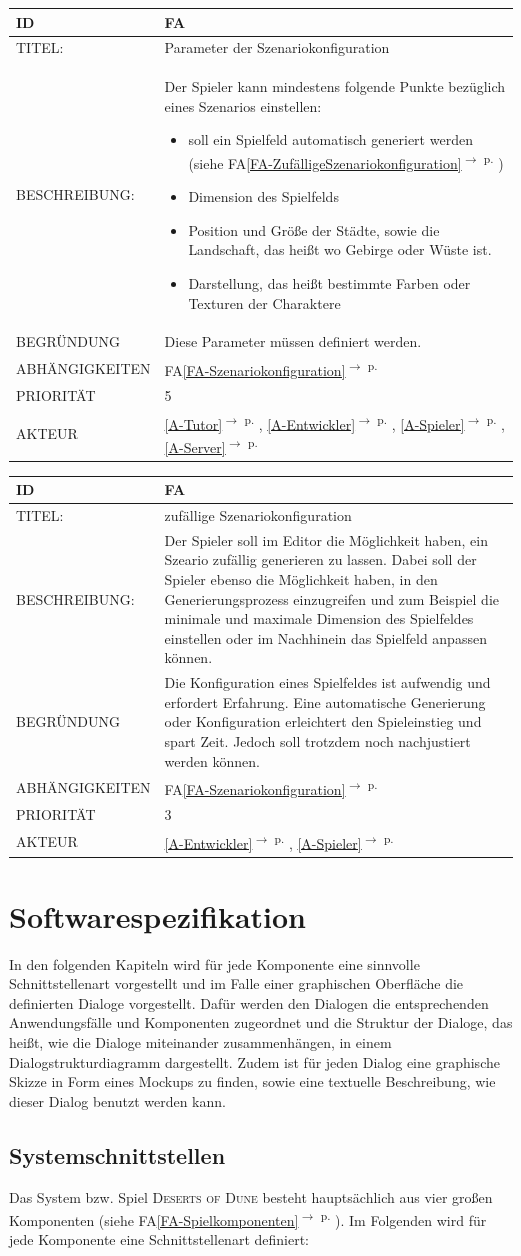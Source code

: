 \documentclass[12pt]{article}
\newcounter{fa}
\newcommand{\fa}[7]{
\refstepcounter{fa}\label{#7}
\begin{tabularx}{16cm}{l|X}
\textbf{ID} & \textbf{FA\arabic{fa}} \\
\hline
TITEL: & #1 \\
\hline
BESCHREIBUNG: & #2 \\
\hline
BEGRÜNDUNG & #3 \\ 
\hline
ABHÄNGIGKEITEN & #4\\ 
\hline 
PRIORITÄT & #5\\ 
\hline 
AKTEUR & #6
\end{tabularx}
\vspace*{0.75cm}
}
\newcommand{\rref}[1]{\ref{#1}\textsuperscript{$\rightarrow$ p. \pageref{#1}}}
\newcommand{\faref}[1]{FA\ref{#1}\textsuperscript{$\rightarrow$ p. \pageref{#1}}}
\begin{document}
\fa{Parameter der Szenariokonfiguration}{Der Spieler kann mindestens folgende Punkte bezüglich eines Szenarios einstellen: 
\begin{itemize}
    \item soll ein Spielfeld automatisch generiert werden (siehe \faref{FA-ZufälligeSzenariokonfiguration})
    \item Dimension des Spielfelds
    \item Position und Größe der Städte, sowie die Landschaft, das heißt wo Gebirge oder Wüste ist. 
    \item Darstellung, das heißt bestimmte Farben oder Texturen der Charaktere
\end{itemize}}{Diese Parameter müssen definiert werden.}{\faref{FA-Szenariokonfiguration}}{5}{\rref{A-Tutor}, \rref{A-Entwickler}, \rref{A-Spieler}, \rref{A-Server}}{FA-Parameter-Szenariokonfiguration}


\fa{zufällige Szenariokonfiguration}{Der Spieler soll im Editor die Möglichkeit haben, ein Szeario zufällig generieren zu lassen. Dabei soll der Spieler ebenso die Möglichkeit haben, in den Generierungsprozess einzugreifen und zum Beispiel die minimale und maximale Dimension des Spielfeldes einstellen oder im Nachhinein das Spielfeld anpassen können.
}{Die Konfiguration eines Spielfeldes ist aufwendig und erfordert Erfahrung. Eine automatische Generierung oder Konfiguration erleichtert den Spieleinstieg und spart Zeit. Jedoch soll trotzdem noch nachjustiert werden können.}{\faref{FA-Szenariokonfiguration}}{3}{\rref{A-Entwickler}, \rref{A-Spieler}}{FA-ZufälligeSzenariokonfiguration}

\section{Softwarespezifikation}
In den folgenden Kapiteln wird für jede Komponente eine sinnvolle Schnittstellenart vorgestellt und im Falle einer graphischen Oberfläche die definierten Dialoge vorgestellt. Dafür werden den Dialogen die entsprechenden Anwendungsfälle und Komponenten zugeordnet und die Struktur der Dialoge, das heißt, wie die Dialoge miteinander zusammenhängen, in einem Dialogstrukturdiagramm dargestellt. Zudem ist für jeden Dialog eine graphische Skizze in Form eines \glqq{}Mockups\grqq{} zu finden, sowie eine textuelle Beschreibung, wie dieser Dialog benutzt werden kann. 
\subsection{Systemschnittstellen}
Das System bzw. Spiel \textsc{Deserts of Dune} besteht hauptsächlich aus vier großen Komponenten (siehe \faref{FA-Spielkomponenten}). Im Folgenden wird für jede Komponente eine Schnittstellenart definiert: 
\end{document}
